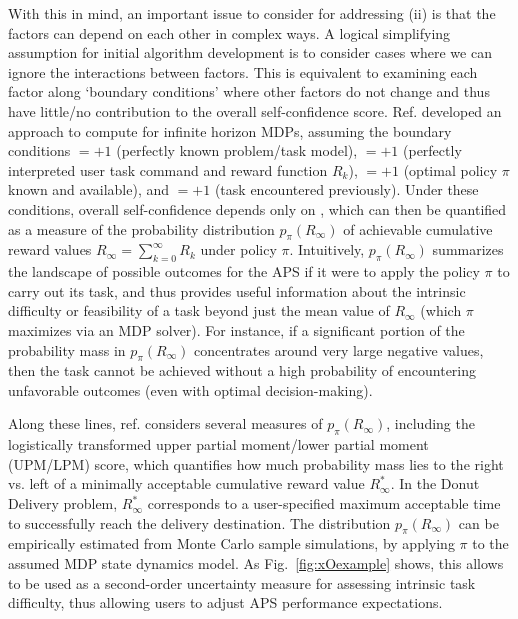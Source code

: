 With this in mind, an important issue to consider for addressing (ii) is that the factors can depend on each other in complex ways. A logical simplifying assumption for initial algorithm development is to consider cases where we can ignore the interactions between factors. This is equivalent to examining each factor along `boundary conditions' where other factors do not change and thus have little/no contribution to the overall self-confidence score. 
Ref. \cite{Aitken2016-cv} developed an approach to compute \xO{} for infinite horizon MDPs, assuming the boundary conditions \xM$=+1$ (perfectly known problem/task model), \xI $= +1$ (perfectly interpreted user task command and reward function $R_k$), \xQ$=+1$ (optimal policy $\pi$ known and available), and \xP$=+1$ (task encountered previously). Under these conditions, overall self-confidence depends only on \xO{}, which can then be quantified as a measure of the probability distribution $p_{\pi}(R_{\infty})$ of achievable cumulative reward values $R_{\infty} = \sum_{k=0}^{\infty}R_{k}$ under policy $\pi$. Intuitively, $p_{\pi}(R_{\infty})$ summarizes the landscape of possible outcomes for the APS if it were to apply the policy $\pi$ to carry out its task, and thus provides useful information about the intrinsic difficulty or feasibility of a task beyond just the mean value of $R_{\infty}$ (which $\pi$ maximizes via an MDP solver). For instance, if a significant portion of the probability mass in $p_{\pi}(R_{\infty})$ concentrates around very large negative values, then the task cannot be achieved without a high probability of encountering unfavorable outcomes (even with optimal decision-making). 

Along these lines, ref. \cite{Aitken2016-cv} considers several measures of $p_{\pi}(R_{\infty})$, including the logistically transformed upper partial moment/lower partial moment (UPM/LPM) score, which quantifies how much probability mass lies to the right vs. left of a minimally acceptable cumulative reward value $R^*_{\infty}$. In the Donut Delivery problem, $R^*_{\infty}$ corresponds to a user-specified maximum acceptable time to successfully reach the delivery destination. The distribution $p_{\pi}(R_{\infty})$ can be empirically estimated from Monte Carlo sample simulations, by applying $\pi$ to the assumed MDP state dynamics model. 
As  Fig.~\ref{fig:xOexample} shows, this allows \xO{} to be used as a second-order uncertainty measure for assessing intrinsic task difficulty, thus allowing users to adjust APS performance expectations. %

